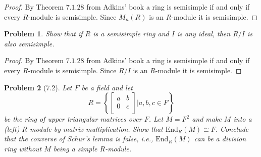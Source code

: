 \documentclass[10pt]{article}
\newcommand{\sk}{\vskip 10mm}
\theoremstyle{plain}
\newtheorem{problem}{Problem}
\theoremstyle{remark}
\begin{document}
\begin{proof}
  By Theorem $7.1.28$ from Adkins' book a ring is semisimple if and
  only if every $R$-module is semisimple. Since $M_n(R)$ is an $R$-module
  it is semisimple.
\end{proof}

\sk

\begin{problem}
  Show that if $R$ is a semisimple ring and $I$ is any ideal, then $R/I$
  is also semisimple.
\end{problem}

\begin{proof}
  By Theorem $7.1.28$ from Adkins' book a ring is semisimple if and
  only if every $R$-module is semisimple. Since $R/I$ is an $R$-module
  it is semisimple.
\end{proof}

\sk

\begin{problem}[7.2]
  Let $F$ be a field and let
  \[
    R =
    \left\{
      \left[
        \begin{array}{cc}
          a&b\\
          0&c\\
        \end{array}
      \right]
      |
      a,b,c\in F
    \right\}
  \]
  be the ring of upper triangular matrices over $F$. Let $M=F^2$ and make
$M$ into a (left) $R$-module by matrix multiplication. Show that
  $\text{End}_R(M)\cong F$. Conclude that the converse of Schur's lemma
  is false, i.e., $\text{End}_R(M)$ can be a division ring without
  $M$ being a simple $R$-module.
\end{problem}
\end{document}
